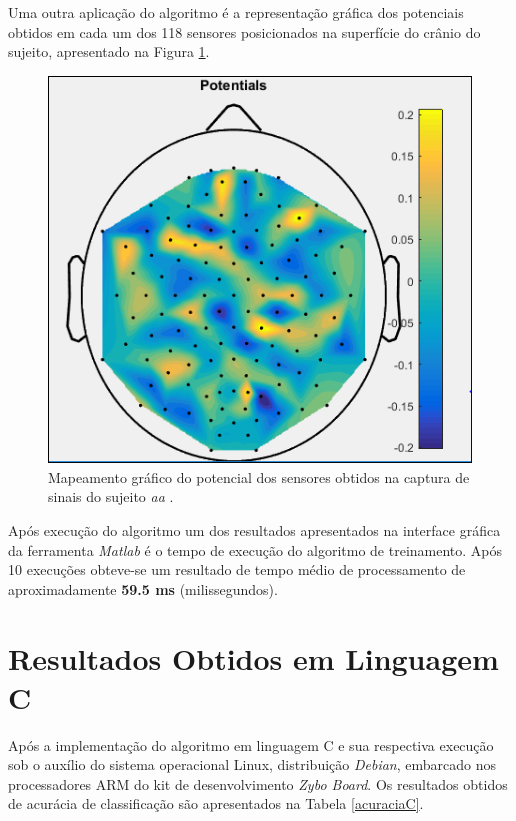 Uma outra aplicação do algoritmo é a representação gráfica dos potenciais obtidos em cada um dos 118 sensores posicionados na superfície do crânio do sujeito, apresentado na Figura \ref{resultadoLotte}.
\newpage
\begin{figure}[h]
	\centering
	\includegraphics[keepaspectratio=true,scale=0.45]{figuras/image_csp_matlab.PNG}
	\caption{Mapeamento gráfico do potencial dos sensores obtidos na captura de sinais do sujeito \textit{aa} \cite{F.Lotte}.}
	\label{resultadoLotte}
\end{figure}

Após execução do algoritmo um dos resultados apresentados na interface gráfica da ferramenta \textit{Matlab} é o tempo de execução do algoritmo de treinamento. Após 10 execuções obteve-se um resultado de tempo médio de processamento de aproximadamente \textbf{59.5 ms} (milissegundos).

\section{Resultados Obtidos em Linguagem C}
Após a implementação do algoritmo em linguagem C e sua respectiva execução sob o auxílio do sistema operacional Linux, distribuição \textit{Debian}, embarcado nos processadores ARM do kit de desenvolvimento \textit{Zybo Board}. Os resultados obtidos de acurácia de classificação são apresentados na Tabela \ref{acuraciaC}.

